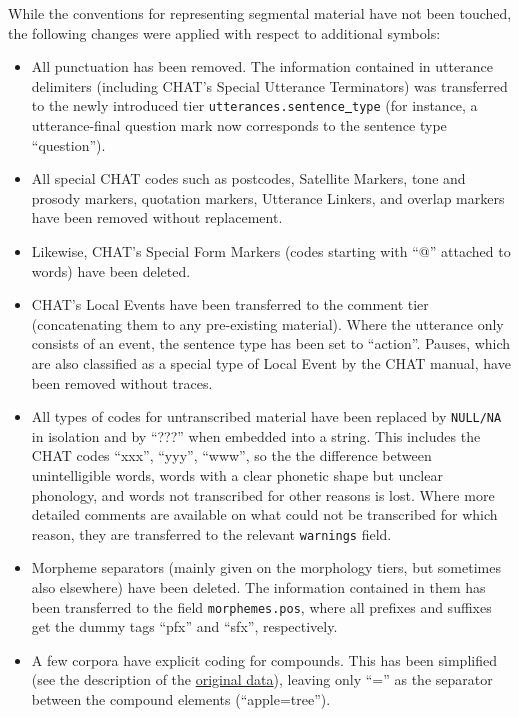 \documentclass[a4paper, 11pt]{book}
\newcommand{\und}{\underline{{ }}\hspace{0.2mm}}	%
\begin{document}
While the conventions for representing segmental material have not been touched, the following changes were applied with respect to additional symbols: 

\begin{itemize}
	\item All punctuation has been removed. The information contained in utterance delimiters (including CHAT’s Special Utterance Terminators) was transferred to the newly introduced tier 
		\texttt{utterances.sentence\und type} (for instance, a utterance-final question mark now corresponds to the sentence type “question”). 
	\item All special CHAT codes such as postcodes, Satellite Markers, tone and prosody markers, quotation markers, Utterance Linkers, and overlap markers have been removed without replacement. 
	\item Likewise, CHAT’s Special Form Markers (codes starting with “@” attached to words) have been deleted. 
	\item CHAT’s Local Events have been transferred to the comment tier (concatenating them to any pre-existing material). Where the utterance only consists of an event, the sentence type has been set to “action”. 
		Pauses, which are also classified as a special type of Local Event by the CHAT manual, have been removed without traces. 
	\item All types of codes for untranscribed material have been replaced by \texttt{NULL/NA} in isolation and by “???” when embedded into a string. This includes the CHAT codes “xxx”, “yyy”, “www”, so the the difference 
		between unintelligible words, words with a clear phonetic shape but unclear phonology, and words not transcribed for other reasons is lost. Where more detailed comments are available on what could not be transcribed
		for which reason, they are transferred to the relevant \texttt{warnings} field. 
	\item Morpheme separators (mainly given on the morphology tiers, but sometimes also elsewhere) have been deleted. The information contained in them has been transferred to the field \texttt{morphemes.pos}, 
		where all prefixes and suffixes get the dummy tags “pfx” and “sfx”, respectively. 
	\item A few corpora have explicit coding for compounds. This has been simplified (see the description of the \hyperref[cha:Data sources]{original data}), leaving only “=” as 
		the separator between the compound elements (“apple=tree”). 
\end{itemize}
\end{document}
